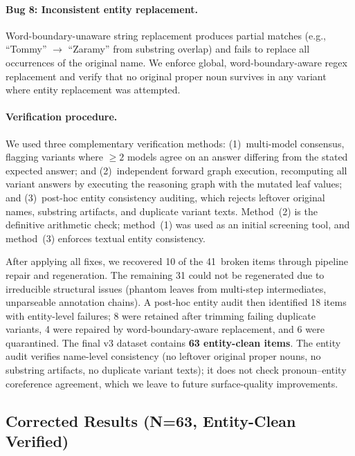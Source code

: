 \paragraph{Bug 8: Inconsistent entity replacement.}
Word-boundary-unaware string replacement produces partial matches
(e.g., ``Tommy'' $\to$ ``Zaramy'' from substring overlap) and fails
to replace all occurrences of the original name. We enforce global,
word-boundary-aware regex replacement and verify that no original
proper noun survives in any variant where entity replacement was
attempted.

\paragraph{Verification procedure.}
We used three complementary verification methods: (1)~multi-model
consensus, flagging variants where $\geq 2$ models agree on an
answer differing from the stated expected answer; and (2)~independent
forward graph execution, recomputing all variant answers by
executing the reasoning graph with the mutated leaf values; and
(3)~post-hoc entity consistency auditing, which rejects leftover
original names, substring artifacts, and duplicate variant texts.
Method~(2) is the definitive arithmetic check; method~(1) was used
as an initial screening tool, and method~(3) enforces textual entity
consistency.

After applying all fixes, we recovered 10 of the 41~broken items
through pipeline repair and regeneration. The remaining 31 could not
be regenerated due to irreducible structural issues (phantom leaves
from multi-step intermediates, unparseable annotation chains). A
post-hoc entity audit then identified 18 items with entity-level
failures; 8 were retained after trimming failing duplicate variants,
4 were repaired by word-boundary-aware replacement, and 6 were
quarantined. The final v3 dataset contains \textbf{63 entity-clean
items}. The entity audit verifies name-level consistency (no leftover
original proper nouns, no substring artifacts, no duplicate variant
texts); it does not check pronoun--entity coreference agreement, which
we leave to future surface-quality improvements.


\subsection{Corrected Results (N=63, Entity-Clean Verified)}
\label{sec:corrected}

